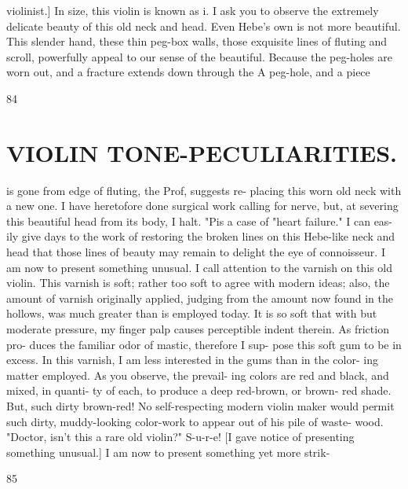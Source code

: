 \documentclass{article}
\begin{document}
violinist.] In size, this violin is known as i. I ask you to observe the extremely delicate beauty of this old neck and head. Even Hebe's own is not more beautiful. This slender hand, these thin peg-box walls, those exquisite lines of fluting and scroll, powerfully appeal to our sense of the beautiful. Because the peg-holes are worn out, and a fracture extends down through the A peg-hole, and a piece

84

\section*{VIOLIN TONE-PECULIARITIES.}
is gone from edge of fluting, the Prof, suggests re- placing this worn old neck with a new one. I have heretofore done surgical work calling for nerve, but, at severing this beautiful head from its body, I halt. "Pis a case of "heart failure." I can eas- ily give days to the work of restoring the broken lines on this Hebe-like neck and head that those lines of beauty may remain to delight the eye of connoisseur. I am now to present something unusual. I call attention to the varnish on this old violin. This varnish is soft; rather too soft to agree with modern ideas; also, the amount of varnish originally applied, judging from the amount now found in the hollows, was much greater than is employed today. It is so soft that with but moderate pressure, my finger palp causes perceptible indent therein. As friction pro- duces the familiar odor of mastic, therefore I sup- pose this soft gum to be in excess. In this varnish, I am less interested in the gums than in the color- ing matter employed. As you observe, the prevail- ing colors are red and black, and mixed, in quanti- ty of each, to produce a deep red-brown, or brown- red shade. But, such dirty brown-red! No self-respecting modern violin maker would permit such dirty, muddy-looking color-work to appear out of his pile of waste- wood. "Doctor, isn't this a rare old violin?" S-u-r-e! [I gave notice of presenting something unusual.] I am now to present something yet more strik-

85
\end{document}
